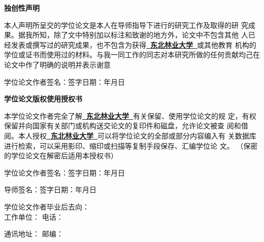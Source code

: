 \pagestyle{empty}
\newcommand{\subchapterstyle}%
  {\song\rmfamily\bfseries\xiaoer}  
\begin{center}{\subchapterstyle 独创性声明}\end{center}

 本人声明所呈交的学位论文是本人在导师指导下进行的研究工作及取得的研
 究成果。据我所知，除了文中特别加以标注和致谢的地方外，论文中不包含其他
 人已经发表或撰写过的研究成果，也不包含为获得\underline{\textbf{~东北林业大学~}}或其他教育
 机构的学位或证书而使用过的材料。与我一同工作的同志对本研究所做的任何贡献均己在论文中作了明确的说明并表示谢意

\vspace{\baselineskip}
\hspace{4em}学位论文作者签名：\hfill 签字日期：\hspace{2.5em}年\hspace{1.5em}月\hspace{1.5em}日

\vspace{2\baselineskip}
\begin{center}{\subchapterstyle 学位论文版权使用授权书}\end{center}

本学位论文作者完全了解\underline{\textbf{~东北林业大学~}}有关保留、使用学位论文的规
定，有权保留并向国家有关部门或机构送交论文的复印件和磁盘，允许论文被查
阅和借阅。本人授权\underline{\textbf{~东北林业大学~}}可以将学位论文的全部或部分内容编入有
关数据库进行检索，可以采用影印、缩印或扫描等复制手段保存、汇编学位论
文。
（保密的学位论文在解密后适用本授权书）

%
%

\vspace{\baselineskip}
\hspace{4em}学位论文作者签名：\hfill 签字日期：\hspace{2.5em}年\hspace{1.5em}月\hspace{1.5em}日

\vspace{\baselineskip}
\hspace{4em}导师签名：\hfill 签字日期：\hspace{2.5em}年\hspace{1.5em}月\hspace{1.5em}日

\vspace{2\baselineskip}
学位论文作者毕业后去向：\\

\vspace{\baselineskip}
\hspace{4em}工作单位：  \hfill 电话：\hspace{10.5em}

\vspace{\baselineskip}
\hspace{4em}通讯地址：  \hfill  邮编：\hspace{10.5em}

